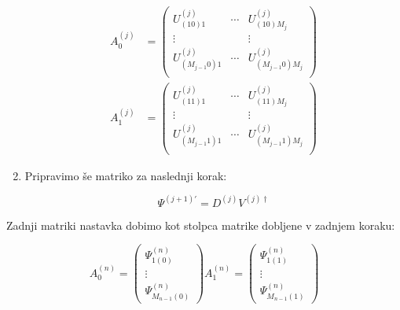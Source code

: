 \documentclass[a4paper]{article}
\begin{document}
\begin{enumerate}
            \begin{equation}\label{eq11}
                \begin{split}
                    A^{(j)}_0 &= \begin{pmatrix}
                        U^{(j)}_{(10)1}       & \cdots & U^{(j)}_{(10)M_j}     \\
                        \vdots                &        & \vdots                 \\
                        U^{(j)}_{(M_{j-1}0)1} & \cdots & U^{(j)}_{(M_{j-1}0)M_j} \\
                    \end{pmatrix} \\
                    A^{(j)}_1 &= \begin{pmatrix}
                        U^{(j)}_{(11)1}       & \cdots & U^{(j)}_{(11)M_j}     \\
                        \vdots                &        & \vdots                 \\
                        U^{(j)}_{(M_{j-1}1)1} & \cdots & U^{(j)}_{(M_{j-1}1)M_j} \\
                    \end{pmatrix}
                \end{split}
            \end{equation}

        \item Pripravimo še matriko za naslednji korak:

            \begin{equation}\label{eq12}
                \Psi^{(j+1)\prime} = D^{(j)}V^{(j)\dagger}
            \end{equation}
           
    \end{enumerate}

    Zadnji matriki nastavka dobimo kot stolpca matrike dobljene v zadnjem koraku:
 
    \begin{equation}\label{eq13}
        A^{(n)}_0 = \begin{pmatrix} \Psi^{(n)}_{1(0)} \\ \vdots \\ \Psi^{(n)}_{M_{n-1}(0)} \end{pmatrix}
        A^{(n)}_1 = \begin{pmatrix} \Psi^{(n)}_{1(1)} \\ \vdots \\ \Psi^{(n)}_{M_{n-1}(1)} \end{pmatrix}
    \end{equation}
\end{document}
